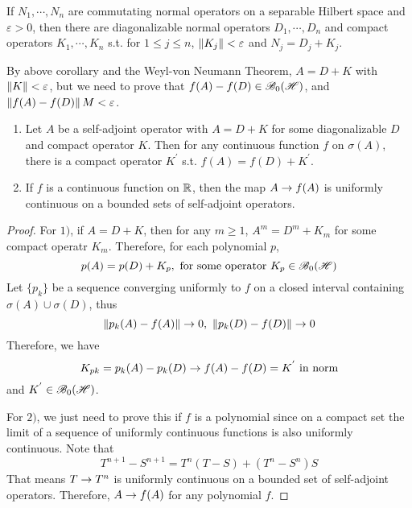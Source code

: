 \begin{thm}
	If $N_1, \cdots, N_n$ are commutating normal operators on a separable Hilbert space and $\varepsilon > 0$, then there are diagonalizable normal operators $D_1,\cdots,D_n$ and compact operators $K_1,\cdots,K_n$ s.t. for $1 \leqslant j \leqslant n$, $\left\lVert K_j\right\lVert < \varepsilon$ and $N_j = D_j + K_j$.
\end{thm}

By above corollary and the Weyl-von Neumann Theorem, $A = D + K$ with $\left\lVert K\right\lVert < \varepsilon$, but we need to prove that $f(A) - f(D) \in \mathscr{B}_{0}\mathscr{(H)}$, and $\left\lVert f(A) - f(D)\right\lVert M< \varepsilon$.

\begin{lem}
	\begin{enumerate}[label=\arabic*)]
		\item Let $A$ be a self-adjoint operator with $A = D + K$ for some diagonalizable $D$ and compact operator $K$. Then for any continuous function $f$ on $\sigma(A)$, there is a compact operator $K^{'}$ s.t. $f(A) = f(D) + K^{'}$.
		\item If $f$ is a continuous function on $\mathbb{R}$, then the map $A \rightarrow f(A)$ is uniformly continuous on a bounded sets of self-adjoint operators.
	\end{enumerate}
\end{lem}
\begin{proof}
	For $1)$, if $A = D + K$, then for any $m \geqslant 1$, $A^m = D^m + K_m$ for some compact operatr $K_m$. Therefore, for each polynomial $p$, 
	\begin{equation*}
		p(A) = p(D) + K_p, \text{ for some operator } K_p \in \mathscr{B}_{0}\mathscr{(H)}
	\end{equation*}
	Let $\{p_k\}$ be a sequence converging uniformly to $f$ on a closed interval containing $\sigma(A) \cup \sigma(D)$, thus
	\begin{equation*}
		\left\lVert p_k(A) - f(A)\right\lVert \rightarrow 0,~ \left\lVert p_k(D) - f(D)\right\lVert \rightarrow 0
	\end{equation*}
	Therefore, we have
	\begin{equation*}
		K_{pk} = p_k(A) - p_k(D) \rightarrow f(A) - f(D) = K^{'} \text{ in norm}
	\end{equation*}
	and $K^{'} \in \mathscr{B}_{0}\mathscr{(H)}$.
	\item For $2)$, we just need to prove this if $f$ is a polynomial since on a compact set the limit of a sequence of uniformly continuous functions is also uniformly continuous. Note that
	\begin{equation*}
		T^{n+1} - S^{n+1} = T^n(T-S) + (T^n - S^n)S
	\end{equation*}
	That means $T \rightarrow T^n$ is uniformly continuous on a bounded set of self-adjoint operators. Therefore, $A \rightarrow f(A)$ for any polynomial $f$.
\end{proof}

